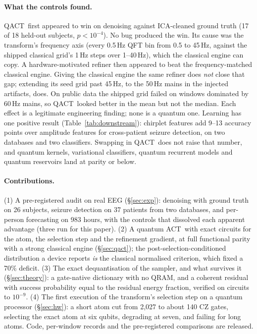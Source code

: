 \documentclass{article}
\newcommand{\qact}{QACT}
\newcommand{\act}{ACT}
\begin{document}
\paragraph{What the controls found.} \qact\ first appeared to win on denoising against ICA-cleaned ground truth (17 of 18 held-out subjects, $p<10^{-4}$). No bug produced the win. Its cause was the transform's frequency axis (every 0.5\,Hz QFT bin from 0.5 to 45\,Hz, against the shipped classical grid's 1\,Hz steps over 1--40\,Hz), which the classical engine can copy. A hardware-motivated refiner then appeared to beat the frequency-matched classical engine. Giving the classical engine the same refiner does \emph{not} close that gap; extending its seed grid past 45\,Hz, to the 50\,Hz mains in the injected artifacts, does. On public data the shipped grid failed on windows dominated by 60\,Hz mains, so \qact\ looked better in the mean but not the median. Each effect is a legitimate engineering finding; none is a quantum one. Learning has one positive result (Table~\ref{tab:downstream}): chirplet features add 9--13 accuracy points over amplitude features for cross-patient seizure detection, on two databases and two classifiers. Swapping in \qact\ does not raise that number, and quantum kernels, variational classifiers, quantum recurrent models and quantum reservoirs land at parity or below.

\paragraph{Contributions.}
(1) A pre-registered audit on real EEG (\S\ref{sec:exp}): denoising with ground truth on 26 subjects, seizure detection on 37 patients from two databases, and per-person forecasting on 983 hours, with the controls that dissolved each apparent advantage (three run for this paper).
(2) A quantum \act\ with exact circuits for the atom, the selection step and the refinement gradient, at full functional parity with a strong classical engine (\S\ref{sec:qact}); the post-selection-conditioned distribution a device reports \emph{is} the classical normalised criterion, which fixed a 70\% deficit.
(3) The exact dequantisation of the sampler, and what survives it (\S\ref{sec:theory}): a gate-native dictionary with no QRAM, and a coherent residual with success probability equal to the residual energy fraction, verified on circuits to $10^{-9}$.
(4) The first execution of the transform's selection step on a quantum processor (\S\ref{sec:hw}): a short atom cut from 2,027 to about 140 CZ gates, selecting the exact atom at six qubits, degrading at seven, and failing for long atoms.
Code, per-window records and the pre-registered comparisons are released.
\end{document}
